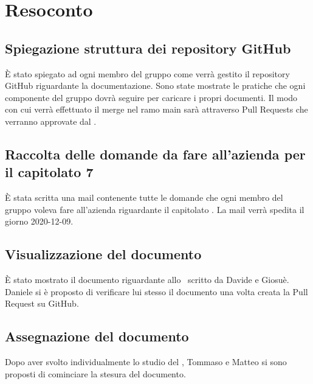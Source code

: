 \newpage


\section{Resoconto}

\subsection{Spiegazione struttura dei repository GitHub}

È stato spiegato ad ogni membro del gruppo come verrà gestito il repository GitHub riguardante la documentazione. Sono state mostrate le pratiche che ogni componente del gruppo dovrà seguire per caricare i propri documenti. Il modo con cui verrà effettuato il merge nel ramo main sarà attraverso Pull Requests che verranno approvate dal \RdP.

\subsection{Raccolta delle domande da fare all'azienda per il capitolato 7}

È stata scritta una mail contenente tutte le domande che ogni membro del gruppo voleva fare all'azienda riguardante il capitolato \textit{\NomeProgetto}.
La mail verrà spedita il giorno 2020-12-09.

\subsection{Visualizzazione del documento \SdF{}}

È stato mostrato il documento riguardante allo \SdF\ scritto da Davide e Giosuè. Daniele si è proposto di verificare lui stesso il documento una volta creata la Pull Request su GitHub.

\subsection{Assegnazione del documento \PdP{}}

Dopo aver svolto individualmente lo studio del \PdP, Tommaso e Matteo si sono proposti di cominciare la stesura del documento.

\newpage

